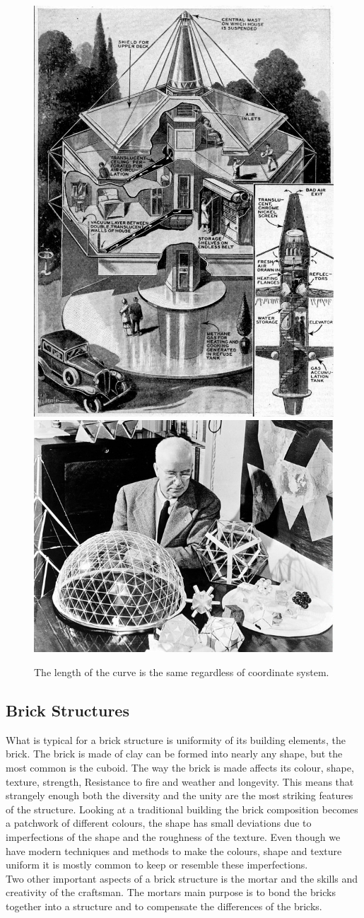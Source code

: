 \begin{figure}[H]
\centering
\includegraphics[height=0.45\linewidth ]{figure/Introduction/Fuller2.jpg}
\includegraphics[height=0.45\linewidth ]{figure/Introduction/fuller3.jpg}
\caption{The length of the curve is the same regardless of coordinate system.}
\end{figure}






  

\subsection{Brick Structures}

What is typical for a brick structure is uniformity of its building elements, the brick. The brick is made of clay can be formed into nearly any shape, but the most common is the cuboid. The way the brick is made affects its colour, shape, texture, strength, Resistance to fire and weather and longevity. This means that strangely enough both the diversity and the unity are the most striking features of the structure. Looking at a traditional building the brick composition becomes a patchwork of different colours, the shape has small deviations due to imperfections of the shape and the roughness of the texture. Even though we have modern techniques and methods to make the colours, shape and texture uniform it is mostly common to keep or resemble these imperfections.\\
Two other important aspects of a brick structure is the mortar and the skills and creativity of the craftsman. The mortars main purpose is to bond the bricks together into a structure and to compensate the differences of the bricks. 

